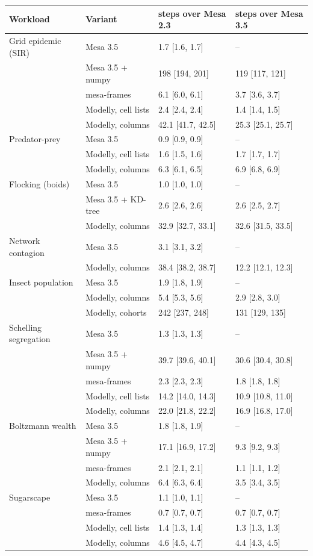 \begin{tabular}{llll}
\toprule
Workload & Variant & steps over Mesa 2.3 & steps over Mesa 3.5 \\
\midrule
Grid epidemic (SIR) & Mesa 3.5 & 1.7 [1.6, 1.7] & -- \\
 & Mesa 3.5 + numpy & 198 [194, 201] & 119 [117, 121] \\
 & mesa-frames & 6.1 [6.0, 6.1] & 3.7 [3.6, 3.7] \\
 & Modelly, cell lists & 2.4 [2.4, 2.4] & 1.4 [1.4, 1.5] \\
 & Modelly, columns & 42.1 [41.7, 42.5] & 25.3 [25.1, 25.7] \\
\addlinespace
Predator-prey & Mesa 3.5 & 0.9 [0.9, 0.9] & -- \\
 & Modelly, cell lists & 1.6 [1.5, 1.6] & 1.7 [1.7, 1.7] \\
 & Modelly, columns & 6.3 [6.1, 6.5] & 6.9 [6.8, 6.9] \\
\addlinespace
Flocking (boids) & Mesa 3.5 & 1.0 [1.0, 1.0] & -- \\
 & Mesa 3.5 + KD-tree & 2.6 [2.6, 2.6] & 2.6 [2.5, 2.7] \\
 & Modelly, columns & 32.9 [32.7, 33.1] & 32.6 [31.5, 33.5] \\
\addlinespace
Network contagion & Mesa 3.5 & 3.1 [3.1, 3.2] & -- \\
 & Modelly, columns & 38.4 [38.2, 38.7] & 12.2 [12.1, 12.3] \\
\addlinespace
Insect population & Mesa 3.5 & 1.9 [1.8, 1.9] & -- \\
 & Modelly, columns & 5.4 [5.3, 5.6] & 2.9 [2.8, 3.0] \\
 & Modelly, cohorts & 242 [237, 248] & 131 [129, 135] \\
\addlinespace
Schelling segregation & Mesa 3.5 & 1.3 [1.3, 1.3] & -- \\
 & Mesa 3.5 + numpy & 39.7 [39.6, 40.1] & 30.6 [30.4, 30.8] \\
 & mesa-frames & 2.3 [2.3, 2.3] & 1.8 [1.8, 1.8] \\
 & Modelly, cell lists & 14.2 [14.0, 14.3] & 10.9 [10.8, 11.0] \\
 & Modelly, columns & 22.0 [21.8, 22.2] & 16.9 [16.8, 17.0] \\
\addlinespace
Boltzmann wealth & Mesa 3.5 & 1.8 [1.8, 1.9] & -- \\
 & Mesa 3.5 + numpy & 17.1 [16.9, 17.2] & 9.3 [9.2, 9.3] \\
 & mesa-frames & 2.1 [2.1, 2.1] & 1.1 [1.1, 1.2] \\
 & Modelly, columns & 6.4 [6.3, 6.4] & 3.5 [3.4, 3.5] \\
\addlinespace
Sugarscape & Mesa 3.5 & 1.1 [1.0, 1.1] & -- \\
 & mesa-frames & 0.7 [0.7, 0.7] & 0.7 [0.7, 0.7] \\
 & Modelly, cell lists & 1.4 [1.3, 1.4] & 1.3 [1.3, 1.3] \\
 & Modelly, columns & 4.6 [4.5, 4.7] & 4.4 [4.3, 4.5] \\
\bottomrule
\end{tabular}
